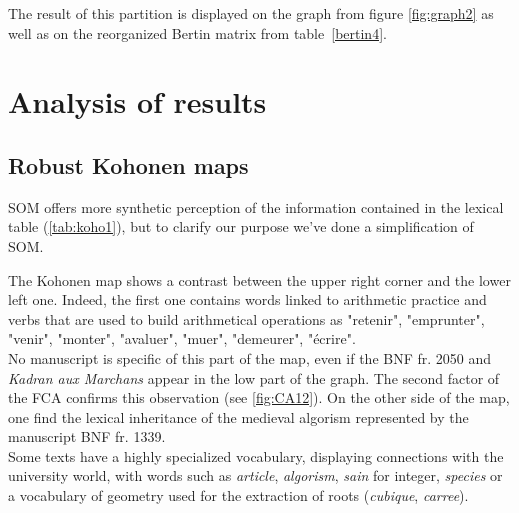 \documentclass[preprint]{elsarticle}
\begin{document}
The result of this partition is displayed on the graph from figure \ref{fig:graph2} as well as on the reorganized Bertin matrix from table~\ref{bertin4}.

\section{Analysis of results}\label{analysis}


\subsection{Robust Kohonen maps}

SOM offers more synthetic perception of the information contained in the lexical table (\ref{tab:koho1}), but to clarify our purpose we've done a simplification of SOM. %


The Kohonen map shows a contrast between the upper right corner and the lower left one.  
Indeed, the first one contains words linked to arithmetic practice and verbs that are used to build arithmetical operations as "retenir", "emprunter", "venir", "monter", "avaluer", "muer", "demeurer", "écrire".\\

No manuscript is specific of this part of the map, even if the BNF fr. 2050 and \textit{Kadran aux Marchans} appear in the low part of the graph. The second factor of the FCA confirms this observation (see \ref{fig:CA12}). On the other side of the map, one find the lexical inheritance of the medieval algorism represented by the manuscript BNF fr. 1339.\\

Some texts have a highly specialized vocabulary, displaying connections with the university world, with words such as \textit{article}, \textit{algorism}, \textit{sain} for integer, \textit{species} or a vocabulary of geometry used for the extraction of roots (\textit{cubique}, \textit{carree}).\\
\end{document}
